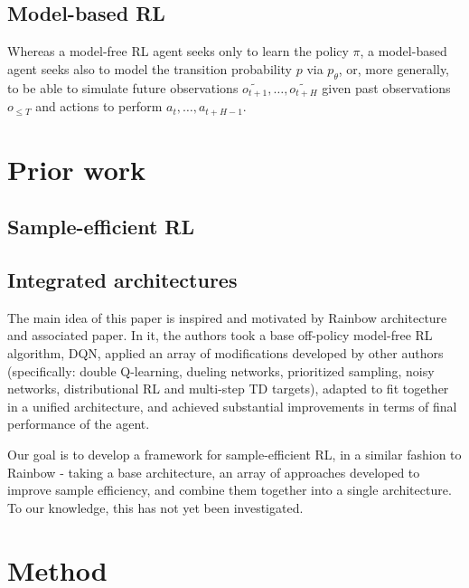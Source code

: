 \documentclass[twoside,11pt]{article}
\begin{document}
\subsection{Model-based RL}

Whereas a model-free RL agent seeks only to learn the policy $\pi$, a model-based agent seeks also to model the transition probability $p$ via $p_\theta$, or, more generally, to be able to simulate future observations $\widetilde{o_{t+1}}, \ldots, \widetilde{o_{t+H}}$ given past observations $o_{\leq T}$ and actions to perform $a_{t}, \ldots, a_{t+H-1}$.

\section{Prior work}

\subsection{Sample-efficient RL}


\subsection{Integrated architectures}

The main idea of this paper is inspired and motivated by Rainbow architecture and associated paper. In it, the authors took a base off-policy model-free RL algorithm, DQN, applied an array of modifications developed by other authors (specifically: double Q-learning, dueling networks, prioritized sampling, noisy networks, distributional RL and multi-step TD targets), adapted to fit together in a unified architecture, and achieved substantial improvements in terms of final performance of the agent.

Our goal is to develop a framework for sample-efficient RL, in a similar fashion to Rainbow - taking a base architecture, an array of approaches developed to improve sample efficiency, and combine them together into a single architecture. To our knowledge, this has not yet been investigated.

\section{Method}
\end{document}
